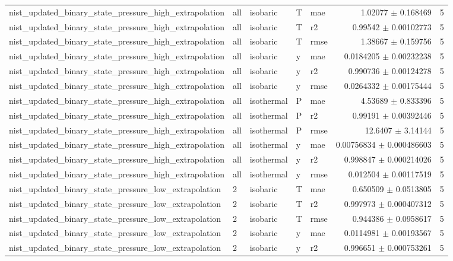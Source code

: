 \begin{tabular}{lllllrr}
nist\_updated\_binary\_state\_pressure\_high\_extrapolation & all & isobaric & T & mae & 1.02077 $\pm$ 0.168469 & 5 \\
nist\_updated\_binary\_state\_pressure\_high\_extrapolation & all & isobaric & T & r2 & 0.99542 $\pm$ 0.00102773 & 5 \\
nist\_updated\_binary\_state\_pressure\_high\_extrapolation & all & isobaric & T & rmse & 1.38667 $\pm$ 0.159756 & 5 \\
nist\_updated\_binary\_state\_pressure\_high\_extrapolation & all & isobaric & y & mae & 0.0184205 $\pm$ 0.00232238 & 5 \\
nist\_updated\_binary\_state\_pressure\_high\_extrapolation & all & isobaric & y & r2 & 0.990736 $\pm$ 0.00124278 & 5 \\
nist\_updated\_binary\_state\_pressure\_high\_extrapolation & all & isobaric & y & rmse & 0.0264332 $\pm$ 0.00175444 & 5 \\
nist\_updated\_binary\_state\_pressure\_high\_extrapolation & all & isothermal & P & mae & 4.53689 $\pm$ 0.833396 & 5 \\
nist\_updated\_binary\_state\_pressure\_high\_extrapolation & all & isothermal & P & r2 & 0.99191 $\pm$ 0.00392446 & 5 \\
nist\_updated\_binary\_state\_pressure\_high\_extrapolation & all & isothermal & P & rmse & 12.6407 $\pm$ 3.14144 & 5 \\
nist\_updated\_binary\_state\_pressure\_high\_extrapolation & all & isothermal & y & mae & 0.00756834 $\pm$ 0.000486603 & 5 \\
nist\_updated\_binary\_state\_pressure\_high\_extrapolation & all & isothermal & y & r2 & 0.998847 $\pm$ 0.000214026 & 5 \\
nist\_updated\_binary\_state\_pressure\_high\_extrapolation & all & isothermal & y & rmse & 0.012504 $\pm$ 0.00117519 & 5 \\
nist\_updated\_binary\_state\_pressure\_low\_extrapolation & 2 & isobaric & T & mae & 0.650509 $\pm$ 0.0513805 & 5 \\
nist\_updated\_binary\_state\_pressure\_low\_extrapolation & 2 & isobaric & T & r2 & 0.997973 $\pm$ 0.000407312 & 5 \\
nist\_updated\_binary\_state\_pressure\_low\_extrapolation & 2 & isobaric & T & rmse & 0.944386 $\pm$ 0.0958617 & 5 \\
nist\_updated\_binary\_state\_pressure\_low\_extrapolation & 2 & isobaric & y & mae & 0.0114981 $\pm$ 0.00193567 & 5 \\
nist\_updated\_binary\_state\_pressure\_low\_extrapolation & 2 & isobaric & y & r2 & 0.996651 $\pm$ 0.000753261 & 5 \\

\end{tabular}

